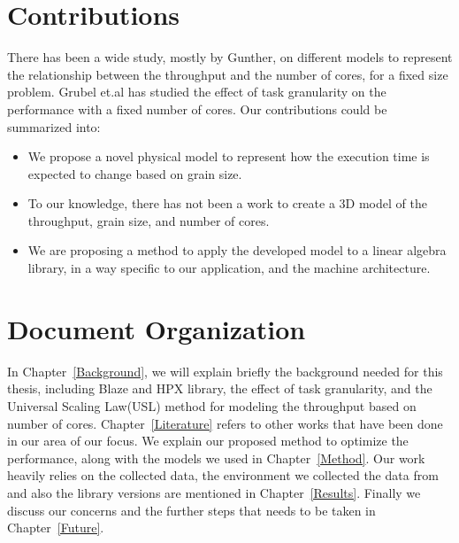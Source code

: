 \vspace{\baselineskip}
\section{Contributions}
There has been a wide study, mostly by Gunther\cite{gunther2000practical,gunther2002new,gunther2007guerrilla,gunther2011new}, on different models to represent the relationship between the throughput and the number of cores, for a fixed size problem. 
Grubel et.al\cite{grubel2015performance} has studied the effect of task granularity on the performance with a fixed number of cores. 
Our contributions could be summarized into:
\begin{itemize}
	\item{We propose a novel physical model to represent how the execution time is expected to change based on grain size.}
	\item{To our knowledge, there has not been a work to create a 3D model of the throughput, grain size, and number of cores.} 
	\item{We are proposing a method to apply the developed model to a linear algebra library, in a way specific to our application, and the machine architecture.}
\end{itemize}
 

\section{Document Organization}
In Chapter~\ref{Background}, we will explain briefly the background needed for this thesis, including Blaze and HPX library, the effect of task granularity, and the Universal Scaling Law(USL) method for modeling the throughput based on number of cores.  
Chapter~\ref{Literature} refers to other works that have been done in our area of our focus. We explain our proposed method to optimize the performance, along with the models we used in Chapter~\ref{Method}. Our work heavily relies on the collected data, the environment we collected the data from and also the library versions are mentioned in Chapter~\ref{Results}.
Finally we discuss our concerns and the further steps that needs to be taken in Chapter~\ref{Future}.

\vspace{\baselineskip}
